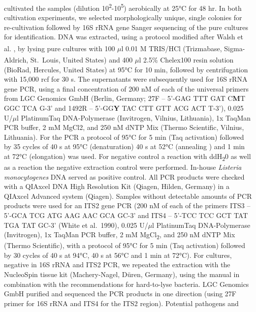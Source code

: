 \documentclass[preprint, 3p,
authoryear]{elsarticle} %
\begin{document}
cultivated the samples (dilution
10\textsuperscript{2}-10\textsuperscript{5}) aerobically at 25°C for 48
hr. In both cultivation experiments, we selected morphologically unique,
single colonies for re-cultivation followed by 16S rRNA gene Sanger
sequencing of the pure cultures for identification. DNA was extracted,
using a protocol modified after Walsh et al. \citep{Walsh.2013}, by
lysing pure cultures with 100 \(\mu\)l 0.01 M TRIS/HCl
(Trizma\textsuperscript{\textregistered}base, Sigma-Aldrich, St.~Louis,
United States) and 400 \(\mu\)l 2.5\%
Chelex\textsuperscript{\textregistered}100 resin solution (BioRad,
Hercules, United States) at 95°C for 10 min, followed by centrifugation
with 15,000 rcf for 30 s. The supernatants were subsequently used for
16S rRNA gene PCR, using a final concentration of 200 nM of each of the
universal primers from LGC Genomics GmbH (Berlin, Germany; 27F -- 5'-GAG
TTT GAT C\textbf{M}T GGC TCA G-3' and 1492R -- 5'-GG\textbf{Y} TAC CTT
GTT ACG ACT T-3'), 0.025 U/\(\mu\)l Platinum\texttrademark Taq
DNA-Polymerase (Invitrogen\texttrademark, Vilnius, Lithuania), 1x TaqMan
PCR buffer, 2 mM MgCl2, and 250 nM dNTP Mix (Thermo
Scientific\texttrademark, Vilnius, Lithuania). For the PCR a protocol of
95°C for 5 min (Taq activation) followed by 35 cycles of 40 s at 95°C
(denaturation) 40 s at 52°C (annealing ) and 1 min at 72°C (elongation)
was used. For negative control a reaction with ddH\textsubscript{2}0 as
well as a reaction the negative extraction control were performed.
In-house \emph{Listeria monocytogenes} DNA served as positive control.
All PCR products were checked with a QIAxcel DNA High Resolution Kit
(Qiagen, Hilden, Germany) in a QIAxcel Advanced system (Qiagen). Samples
without detectable amounts of PCR products were used for an ITS2 gene
PCR (200 nM of each of the primers ITS3 -- 5'-GCA TCG ATG AAG AAC GCA
GC-3' and ITS4 -- 5'-TCC TCC GCT TAT TGA TAT GC-3' (White et al.~1990),
0.025 U/\(\mu\)l Platinum\texttrademark Taq DNA-Polymerase
(Invitrogen\texttrademark), 1x TaqMan PCR buffer, 2 mM
MgCl\textsubscript{2}, and 250 nM dNTP Mix (Thermo
Scientific\texttrademark), with a protocol of 95°C for 5 min (Taq
activation) followed by 30 cycles of 40 s at 94°C, 40 s at 56°C and 1
min at 72°C). For cultures, negative in 16S rRNA and ITS2 PCR, we
repeated the extraction with the NucleoSpin tissue kit (Machery-Nagel,
Düren, Germany), using the manual in combination with the
recommendations for hard-to-lyse bacteria. LGC Genomics GmbH purified
and sequenced the PCR products in one direction (using 27F primer for
16S rRNA and ITS4 for the ITS2 region). Potential pathogens and
\end{document}
